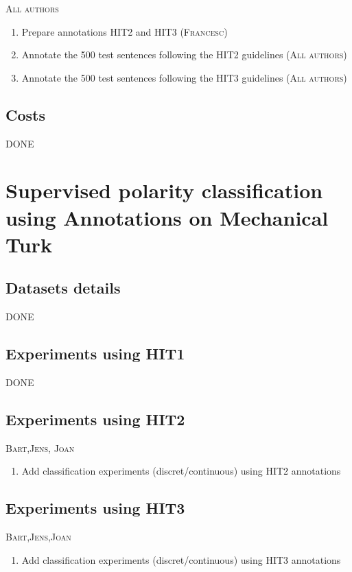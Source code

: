 \documentclass[11pt, a4paper,onecolumn]{article}
\begin{document}
\textsc{All authors}

\begin{enumerate}
\item Prepare annotations HIT2 and HIT3 (\textsc{Francesc})
\item Annotate the 500 test sentences following the HIT2 guidelines (\textsc{All authors})
\item Annotate the 500 test sentences following the HIT3 guidelines (\textsc{All authors})
\end{enumerate}

\subsection{Costs}

DONE

\section{Supervised polarity classification using Annotations on Mechanical Turk}

\subsection{Datasets details}

DONE

\subsection{Experiments using HIT1}

DONE

\subsection{Experiments using HIT2}

\textsc{Bart,Jens, Joan}

\begin{enumerate}
\item Add classification experiments (discret/continuous) using HIT2 annotations
\end{enumerate}

\subsection{Experiments using HIT3}

\textsc{Bart,Jens,Joan}

\begin{enumerate}
\item Add classification experiments (discret/continuous) using HIT3 annotations
\end{enumerate}
\end{document}
